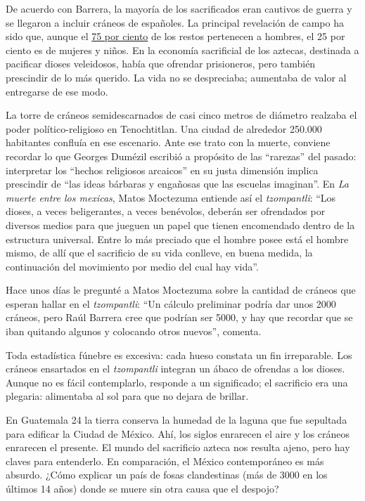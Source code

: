 De acuerdo con Barrera, la mayoría de los sacrificados eran cautivos de
guerra y se llegaron a incluir cráneos de españoles. La principal
revelación de campo ha sido que, aunque el
\href{https://www.abc.es/historia/abci-tzompantli-bestial-ofrenda-azteca-dioses-derribaron-conquistadores-espanoles-201809240905_noticia.html}{75
por ciento} de los restos pertenecen a hombres, el 25 por ciento es de
mujeres y niños. En la economía sacrificial de los aztecas, destinada a
pacificar dioses veleidosos, había que ofrendar prisioneros, pero
también prescindir de lo más querido. La vida no se despreciaba;
aumentaba de valor al entregarse de ese modo.

La torre de cráneos semidescarnados de casi cinco metros de diámetro
realzaba el poder político-religioso en Tenochtitlan. Una ciudad de
alrededor 250.000 habitantes confluía en ese escenario. Ante ese trato
con la muerte, conviene recordar lo que Georges Dumézil escribió a
propósito de las ``rarezas'' del pasado: interpretar los ``hechos
religiosos arcaicos'' en su justa dimensión implica prescindir de ``las
ideas bárbaras y engañosas que las escuelas imaginan''. En \emph{La
muerte entre los mexicas}, Matos Moctezuma entiende así el
\emph{tzompantli}: ``Los dioses, a veces beligerantes, a veces
benévolos, deberán ser ofrendados por diversos medios para que jueguen
un papel que tienen encomendado dentro de la estructura universal. Entre
lo más preciado que el hombre posee está el hombre mismo, de allí que el
sacrificio de su vida conlleve, en buena medida, la continuación del
movimiento por medio del cual hay vida''.

Hace unos días le pregunté a Matos Moctezuma sobre la cantidad de
cráneos que esperan hallar en el \emph{tzompantli}: ``Un cálculo
preliminar podría dar unos 2000 cráneos, pero Raúl Barrera cree que
podrían ser 5000, y hay que recordar que se iban quitando algunos y
colocando otros nuevos'', comenta.

Toda estadística fúnebre es excesiva: cada hueso constata un fin
irreparable. Los cráneos ensartados en el \emph{tzompantli} integran un
ábaco de ofrendas a los dioses. Aunque no es fácil contemplarlo,
responde a un significado; el sacrificio era una plegaria: alimentaba al
sol para que no dejara de brillar.

En Guatemala 24 la tierra conserva la humedad de la laguna que fue
sepultada para edificar la Ciudad de México. Ahí, los siglos enrarecen
el aire y los cráneos enrarecen el presente. El mundo del sacrificio
azteca nos resulta ajeno, pero hay claves para entenderlo. En
comparación, el México contemporáneo es más absurdo. ¿Cómo explicar un
país de fosas clandestinas (más de 3000 en los últimos 14 años) donde se
muere sin otra causa que el despojo?

